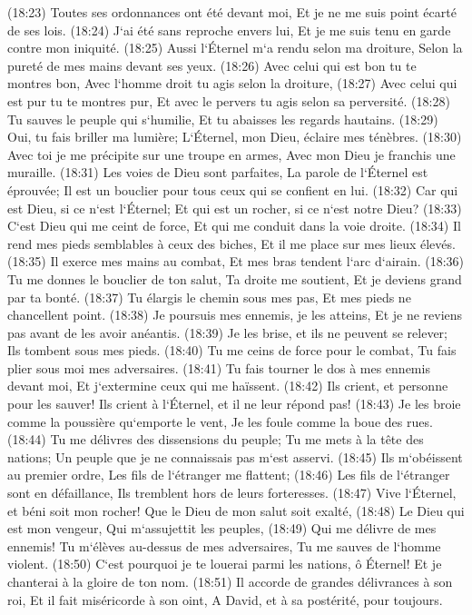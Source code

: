 \verse (18:23) Toutes ses ordonnances ont été devant moi, Et je ne me suis point écarté de ses lois. 
\verse (18:24) J`ai été sans reproche envers lui, Et je me suis tenu en garde contre mon iniquité. 
\verse (18:25) Aussi l`Éternel m`a rendu selon ma droiture, Selon la pureté de mes mains devant ses yeux. 
\verse (18:26) Avec celui qui est bon tu te montres bon, Avec l`homme droit tu agis selon la droiture, 
\verse (18:27) Avec celui qui est pur tu te montres pur, Et avec le pervers tu agis selon sa perversité. 
\verse (18:28) Tu sauves le peuple qui s`humilie, Et tu abaisses les regards hautains. 
\verse (18:29) Oui, tu fais briller ma lumière; L`Éternel, mon Dieu, éclaire mes ténèbres. 
\verse (18:30) Avec toi je me précipite sur une troupe en armes, Avec mon Dieu je franchis une muraille. 
\verse (18:31) Les voies de Dieu sont parfaites, La parole de l`Éternel est éprouvée; Il est un bouclier pour tous ceux qui se confient en lui. 
\verse (18:32) Car qui est Dieu, si ce n`est l`Éternel; Et qui est un rocher, si ce n`est notre Dieu? 
\verse (18:33) C`est Dieu qui me ceint de force, Et qui me conduit dans la voie droite. 
\verse (18:34) Il rend mes pieds semblables à ceux des biches, Et il me place sur mes lieux élevés. 
\verse (18:35) Il exerce mes mains au combat, Et mes bras tendent l`arc d`airain. 
\verse (18:36) Tu me donnes le bouclier de ton salut, Ta droite me soutient, Et je deviens grand par ta bonté. 
\verse (18:37) Tu élargis le chemin sous mes pas, Et mes pieds ne chancellent point. 
\verse (18:38) Je poursuis mes ennemis, je les atteins, Et je ne reviens pas avant de les avoir anéantis. 
\verse (18:39) Je les brise, et ils ne peuvent se relever; Ils tombent sous mes pieds. 
\verse (18:40) Tu me ceins de force pour le combat, Tu fais plier sous moi mes adversaires. 
\verse (18:41) Tu fais tourner le dos à mes ennemis devant moi, Et j`extermine ceux qui me haïssent. 
\verse (18:42) Ils crient, et personne pour les sauver! Ils crient à l`Éternel, et il ne leur répond pas! 
\verse (18:43) Je les broie comme la poussière qu`emporte le vent, Je les foule comme la boue des rues. 
\verse (18:44) Tu me délivres des dissensions du peuple; Tu me mets à la tête des nations; Un peuple que je ne connaissais pas m`est asservi. 
\verse (18:45) Ils m`obéissent au premier ordre, Les fils de l`étranger me flattent; 
\verse (18:46) Les fils de l`étranger sont en défaillance, Ils tremblent hors de leurs forteresses. 
\verse (18:47) Vive l`Éternel, et béni soit mon rocher! Que le Dieu de mon salut soit exalté, 
\verse (18:48) Le Dieu qui est mon vengeur, Qui m`assujettit les peuples, 
\verse (18:49) Qui me délivre de mes ennemis! Tu m`élèves au-dessus de mes adversaires, Tu me sauves de l`homme violent. 
\verse (18:50) C`est pourquoi je te louerai parmi les nations, ô Éternel! Et je chanterai à la gloire de ton nom. 
\verse (18:51) Il accorde de grandes délivrances à son roi, Et il fait miséricorde à son oint, A David, et à sa postérité, pour toujours. 

